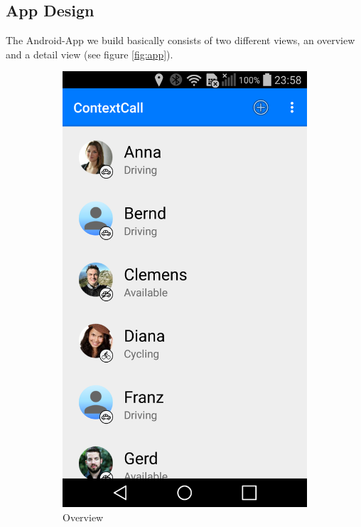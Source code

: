 \documentclass{sigchi}
\begin{document}
\subsection{App Design}
The Android-App we build basically consists of two different views, an overview and a detail view (see figure \ref{fig:app}).
\newline
\begin{figure}[H]
\centering
\begin{subfigure}{.23\textwidth}
  \centering
  \includegraphics[width=.7\linewidth]{figures/app_1}
  \caption{Overview}
  \label{fig:app_1}
\end{subfigure}
\begin{subfigure}{.23\textwidth}
  \centering

\end{subfigure}
\end{figure}
\end{document}

